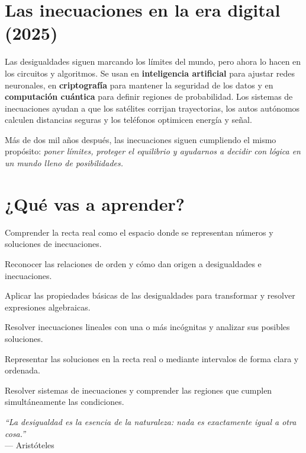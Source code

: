 \section*{Las inecuaciones en la era digital (2025)}

\begin{reseñaplana}  
Las desigualdades siguen marcando los límites del mundo, pero ahora lo hacen en los circuitos y algoritmos.  
Se usan en \textbf{inteligencia artificial} para ajustar redes neuronales, en \textbf{criptografía} para mantener la seguridad 
de los datos y en \textbf{computación cuántica} para definir regiones de probabilidad.  
Los sistemas de inecuaciones ayudan a que los satélites corrijan trayectorias, los autos autónomos calculen distancias 
seguras y los teléfonos optimicen energía y señal.

Más de dos mil años después, las inecuaciones siguen cumpliendo el mismo propósito:  
\textit{poner límites, proteger el equilibrio y ayudarnos a decidir con lógica en un mundo lleno de posibilidades.}
\end{reseñaplana}

\section*{¿Qué vas a aprender?}
\begin{aprende}
  \item Comprender la recta real como el espacio donde se representan números y soluciones de inecuaciones.  
  \item Reconocer las relaciones de orden y cómo dan origen a desigualdades e inecuaciones.  
  \item Aplicar las propiedades básicas de las desigualdades para transformar y resolver expresiones algebraicas.  
  \item Resolver inecuaciones lineales con una o más incógnitas y analizar sus posibles soluciones.  
  \item Representar las soluciones en la recta real o mediante intervalos de forma clara y ordenada.  
  \item Resolver sistemas de inecuaciones y comprender las regiones que cumplen simultáneamente las condiciones.  
\end{aprende}

\vspace{1cm}
\begin{flushright}
  {\oneptup\itshape ``La desigualdad es la esencia de la naturaleza: nada es exactamente igual a otra cosa.''}\\
  {\oneptup — Aristóteles}
\end{flushright}

